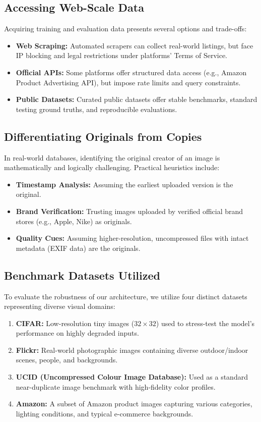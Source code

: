\documentclass[11pt,a4paper]{article}
\begin{document}
\subsection{Accessing Web-Scale Data}
Acquiring training and evaluation data presents several options and trade-offs:
\begin{itemize}
    \item \textbf{Web Scraping:} Automated scrapers can collect real-world listings, but face IP blocking and legal restrictions under platforms' Terms of Service.
    \item \textbf{Official APIs:} Some platforms offer structured data access (e.g., Amazon Product Advertising API), but impose rate limits and query constraints.
    \item \textbf{Public Datasets:} Curated public datasets offer stable benchmarks, standard testing ground truths, and reproducible evaluations.
\end{itemize}

\subsection{Differentiating Originals from Copies}
In real-world databases, identifying the original creator of an image is mathematically and logically challenging. Practical heuristics include:
\begin{itemize}
    \item \textbf{Timestamp Analysis:} Assuming the earliest uploaded version is the original.
    \item \textbf{Brand Verification:} Trusting images uploaded by verified official brand stores (e.g., Apple, Nike) as originals.
    \item \textbf{Quality Cues:} Assuming higher-resolution, uncompressed files with intact metadata (EXIF data) are the originals.
\end{itemize}

\subsection{Benchmark Datasets Utilized}
To evaluate the robustness of our architecture, we utilize four distinct datasets representing diverse visual domains:
\begin{enumerate}
    \item \textbf{CIFAR:} Low-resolution tiny images ($32\times32$) used to stress-test the model's performance on highly degraded inputs.
    \item \textbf{Flickr:} Real-world photographic images containing diverse outdoor/indoor scenes, people, and backgrounds.
    \item \textbf{UCID (Uncompressed Colour Image Database):} Used as a standard near-duplicate image benchmark with high-fidelity color profiles.
    \item \textbf{Amazon:} A subset of Amazon product images capturing various categories, lighting conditions, and typical e-commerce backgrounds.
\end{enumerate}
\end{document}
